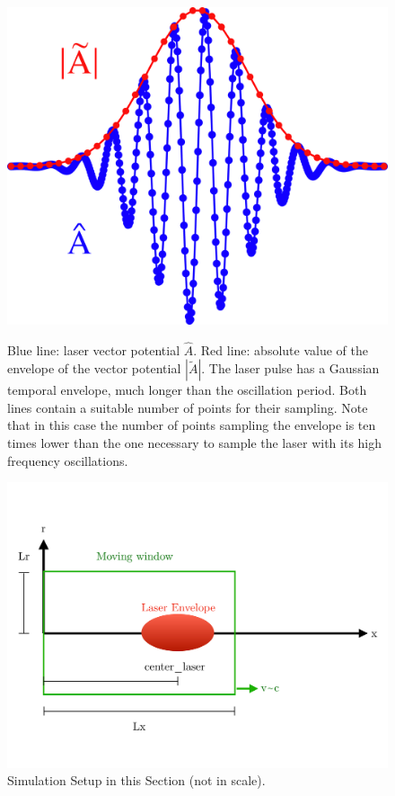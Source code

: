 \documentclass{article}
\begin{document}
\begin{figure}[!htb]
   \begin{minipage}{0.35\textwidth}
     \centering
     \includegraphics[width=1\linewidth]{Envelope_Figure.png}
     \caption{Blue line: laser vector potential $\hat{A}$. Red line: absolute value of the envelope of the vector potential $|\tilde{A}|$. The laser pulse has a Gaussian temporal envelope, much longer than the oscillation period. Both lines contain a suitable number of points for their sampling. Note that in  this case the number of points sampling the envelope is ten times lower than the one necessary to sample the laser with its high frequency oscillations.}\label{fig:envelope}
   \end{minipage}\hfill
   \begin{minipage}{0.65\textwidth}
     \centering
     \includegraphics[width=1\linewidth]{Schema_Simulation_1.pdf}
     \caption{Simulation Setup in this Section (not in scale).}\label{Schema1}
   \end{minipage}
\end{figure}
\end{document}
